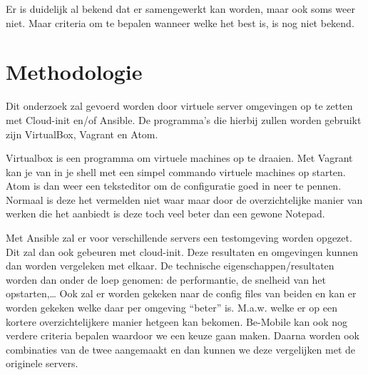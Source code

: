 Er is duidelijk al bekend dat er samengewerkt kan worden, maar ook soms weer niet. Maar criteria om te bepalen wanneer welke het best is, is nog niet bekend. 












\section{Methodologie}
\label{sec:methodologie}

Dit onderzoek zal gevoerd worden door virtuele server omgevingen op te zetten met Cloud-init en/of Ansible. De programma’s die hierbij zullen worden gebruikt zijn VirtualBox, Vagrant en Atom. 

Virtualbox is een programma om virtuele machines op te draaien. Met Vagrant kan je van in je shell met een simpel commando virtuele machines op starten. Atom is dan weer een teksteditor om de configuratie goed in neer te pennen. Normaal is deze het vermelden niet waar maar door de overzichtelijke manier van werken die het aanbiedt is deze toch veel beter dan een gewone Notepad.

Met Ansible zal er voor verschillende servers een testomgeving worden opgezet. Dit zal dan ook gebeuren met cloud-init. Deze resultaten en omgevingen kunnen dan worden  vergeleken met elkaar. De technische eigenschappen/resultaten worden dan onder de loep genomen: de performantie, de snelheid van het opstarten,… Ook zal er worden gekeken naar de config files van beiden en kan er worden gekeken welke daar per omgeving “beter” is. M.a.w. welke er op een kortere overzichtelijkere manier hetgeen kan bekomen. Be-Mobile kan ook nog verdere criteria bepalen waardoor we een keuze gaan maken. Daarna worden ook  combinaties van de twee aangemaakt en dan kunnen we deze vergelijken met de originele servers. 

